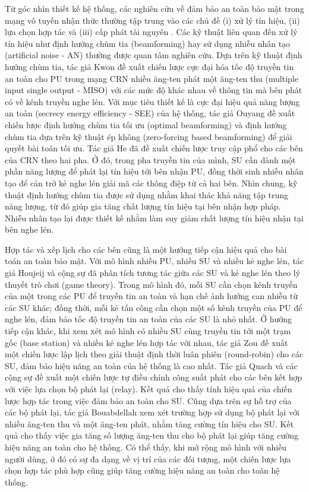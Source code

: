 \documentclass[../main.tex]{subfiles}
\begin{document}
Từ góc nhìn thiết kế hệ thống, các nghiên cứu về đảm bảo an toàn bảo mật trong mạng vô tuyến nhận thức thường tập trung vào các chủ đề (i) xử lý tín hiệu, (ii) lựa chọn hợp tác và (iii) cấp phát tài nguyên \cite{wang2018survey}. Các kỹ thuật liên quan đến xử lý tín hiệu như định hướng chùm tia (beamforming) hay sử dụng nhiễu nhân tạo (artificial noise - AN) thường được quan tâm nghiên cứu. Dựa trên kỹ thuật định hướng chùm tia, tác giả Kwon \cite{kwon2012secure} đề xuất chiến lược cực đại hóa tốc độ truyền tin an toàn cho PU trong mạng CRN nhiều ăng-ten phát một ăng-ten thu (multiple input single output - MISO) với các mức độ khác nhau về thông tin mà bên phát có về kênh truyền nghe lén. Với mục tiêu thiết kế là cực đại hiệu quả năng lượng an toàn (secrecy energy efficiency - SEE) của hệ thống, tác giả Ouyang \cite{ouyang2017secrecy} đề xuất chiến lược định hướng chùm tia tối ưu (optimal beamforming) và định hướng chùm tia dựa trên kỹ thuật ép không (zero-forcing based beamforming) để giải quyết bài toán tối ưu. Tác giả He \cite{he2014secrecy} đã đề xuất chiến lược truy cập phổ cho các bên của CRN theo hai pha. Ở đó, trong pha truyền tin của mình, SU cần dành một phần năng lượng để phát lại tín hiệu tới bên nhận PU, đồng thời sinh nhiễu nhân tạo để cản trở kẻ nghe lén giải mã các thông điệp từ cả hai bên. Nhìn chung, kỹ thuật định hướng chùm tia được sử dụng nhằm khai thác khả năng tập trung năng lượng, từ đó giúp gia tăng chất lượng tín hiệu tại bên nhận hợp pháp. Nhiễu nhân tạo lại được thiết kế nhằm làm suy giảm chất lượng tín hiệu nhận tại bên nghe lén.

Hợp tác và xếp lịch cho các bên cũng là một hướng tiếp cận hiệu quả cho bài toán an toàn bảo mật. Với mô hình nhiều PU, nhiều SU và nhiều kẻ nghe lén, tác giả Houjeij và cộng sự \cite{houjeij2013game} đã phân tích tương tác giữa các SU và kẻ nghe lén theo lý thuyết trò chơi (game theory). Trong mô hình đó, mỗi SU cần chọn kênh truyền của một trong các PU để truyền tin an toàn và hạn chế ảnh hưởng can nhiễu từ các SU khác; đồng thời, mỗi kẻ tấn công cần chọn một số kênh truyền của PU để nghe lén, đảm bảo tốc độ truyền tin an toàn của các SU là nhỏ nhất. Ở hướng tiếp cận khác, khi xem xét mô hình có nhiều SU cùng truyền tin tới một trạm gốc (base station) và nhiều kẻ nghe lén hợp tác với nhau, tác giả Zou \cite{zou2014secrecy} đề xuất một chiến lược lập lịch theo giải thuật định thời luân phiên (round-robin) cho các SU, đảm bảo hiệu năng an toàn của hệ thống là cao nhất. Tác giả Quach và các cộng sự \cite{quach2017secrecy} đề xuất một chiến lược tự điều chỉnh công suất phát cho các bên kết hợp với việc lựa chọn bộ phát lại (relay). Kết quả cho thấy tính hiệu quả của chiến lược hợp tác trong việc đảm bảo an toàn cho SU. Cũng dựa trên sự hỗ trợ của các bộ phát lại, tác giả Bouabdellah \cite{bouabdellah2018secrecy} xem xét trường hợp sử dụng bộ phát lại với nhiều ăng-ten thu và một ăng-ten phát, nhằm tăng cường tín hiệu cho SU. Kết quả cho thấy việc gia tăng số lượng ăng-ten thu cho bộ phát lại giúp tăng cường hiệu năng an toàn cho hệ thống. Có thể thấy, khi mở rộng mô hình với nhiều người dùng, ở đó có sự đa dạng về vị trí của các đối tượng, một chiến lược lựa chọn hợp tác phù hợp cũng giúp tăng cường hiệu năng an toàn cho toàn hệ thống.
\end{document}
